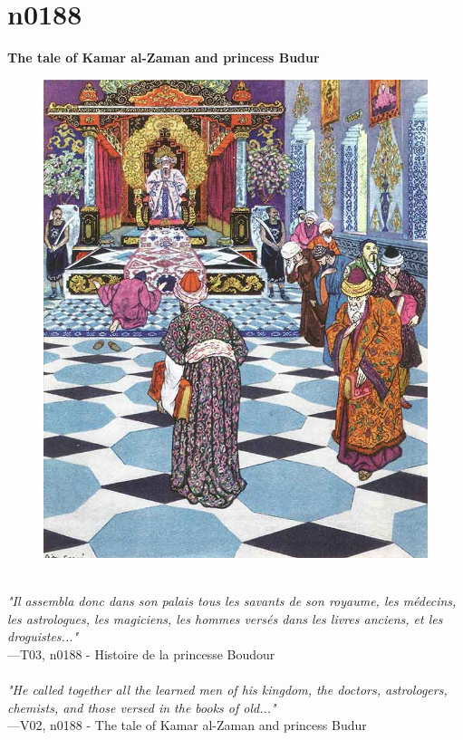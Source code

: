 \documentclass[../Carre_nights.tex]{subfiles}
\begin{document}
\newpage

\section{n0188}
\textbf{\Large{The tale of Kamar al-Zaman and princess Budur}} \\

\begin{figure}[ht]
\centering
\includegraphics[height=\figsize]{illustrations/volume_3/T03, n0188 - Histoire de la princesse Boudour.jpg}
\end{figure}

\textit{\\
"Il assembla donc dans son palais tous les savants de son royaume, les médecins, les astrologues, les magiciens, les hommes versés dans les livres anciens, et les droguistes..."} \\
—T03, n0188 - Histoire de la princesse Boudour \\~\\
\textit{"He called together all the learned men of his kingdom, the doctors, astrologers, chemists, and those versed in the books of old..."} \\
—V02, n0188 - The tale of Kamar al-Zaman and princess Budur
\end{document}
